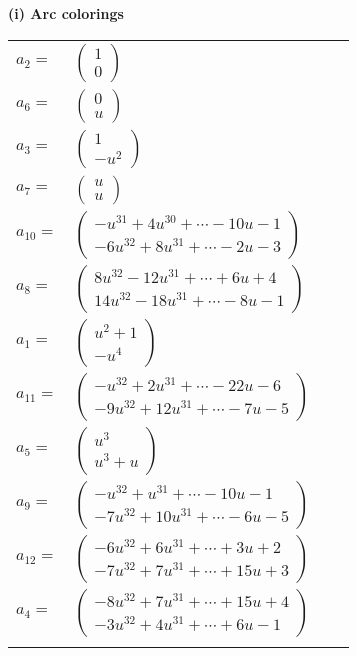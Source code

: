 \documentclass[1p]{elsarticle_modified}
\theoremstyle{definition}
\begin{document}
\flushleft \textbf{(i) Arc colorings}\\
\begin{tabular}{m{7pt} m{180pt} m{7pt} m{180pt} }
\flushright $a_{2}=$&$\begin{pmatrix}1\\0\end{pmatrix}$ \\
\flushright $a_{6}=$&$\begin{pmatrix}0\\u\end{pmatrix}$ \\
\flushright $a_{3}=$&$\begin{pmatrix}1\\- u^2\end{pmatrix}$ \\
\flushright $a_{7}=$&$\begin{pmatrix}u\\u\end{pmatrix}$ \\
\flushright $a_{10}=$&$\begin{pmatrix}- u^{31}+4 u^{30}+\cdots-10 u-1\\-6 u^{32}+8 u^{31}+\cdots-2 u-3\end{pmatrix}$ \\
\flushright $a_{8}=$&$\begin{pmatrix}8 u^{32}-12 u^{31}+\cdots+6 u+4\\14 u^{32}-18 u^{31}+\cdots-8 u-1\end{pmatrix}$ \\
\flushright $a_{1}=$&$\begin{pmatrix}u^2+1\\- u^4\end{pmatrix}$ \\
\flushright $a_{11}=$&$\begin{pmatrix}- u^{32}+2 u^{31}+\cdots-22 u-6\\-9 u^{32}+12 u^{31}+\cdots-7 u-5\end{pmatrix}$ \\
\flushright $a_{5}=$&$\begin{pmatrix}u^3\\u^3+u\end{pmatrix}$ \\
\flushright $a_{9}=$&$\begin{pmatrix}- u^{32}+u^{31}+\cdots-10 u-1\\-7 u^{32}+10 u^{31}+\cdots-6 u-5\end{pmatrix}$ \\
\flushright $a_{12}=$&$\begin{pmatrix}-6 u^{32}+6 u^{31}+\cdots+3 u+2\\-7 u^{32}+7 u^{31}+\cdots+15 u+3\end{pmatrix}$ \\
\flushright $a_{4}=$&$\begin{pmatrix}-8 u^{32}+7 u^{31}+\cdots+15 u+4\\-3 u^{32}+4 u^{31}+\cdots+6 u-1\end{pmatrix}$\\&\end{tabular}
\end{document}
